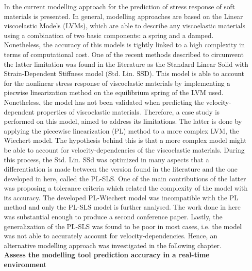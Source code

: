 In  the current modelling approach for the prediction of stress response of soft materials is presented. In general, modelling approaches are based on the Linear viscoelastic Models (LVMs), which are able to describe any viscoelastic materials using a combination of two basic components: a spring and a damped. Nonetheless, the accuracy of this models is tightly linked to a high complexity in terms of computational cost. One of the recent methods described to circumvent the latter limitation was found in the literature as the Standard Linear Solid with Strain-Dependent Stiffness model (Std. Lin. SSD). This model is able to account for the nonlinear stress response of viscoelastic materials by implementing a piecwise linearization method on the equilibrium spring of the LVM used. Nonetheless, the model has not been validated when predicting the velocity-dependent properties of viscoelastic materials. Therefore, a case study is performed on this model, aimed to address its limitations. The latter is done by applying the piecewise linearization (PL) method to a more complex LVM, the Wiechert model. The hypothesis behind this is that a more complex model might be able to account for velocity-dependencies of the viscoelastic materials. During this process, the Std. Lin. SSd was optimized in many aspects that a differentiation is made between the version found in the literature and the one developed in here, called the PL-SLS. One of the main contributions of the latter was proposing a tolerance criteria which related the complexity of the model with its accuracy. The developed PL-Wiechert model was incompatible with the PL method and only the PL-SLS model is further analysed. The work done in here was substantial enough to produce a second conference paper. Lastly, the generalization of the PL-SLS was found to be poor in most cases, i.e. the model was not able to accurately account for velocity-dependencies. Hence, an alternative modelling approach was investigated in the following chapter.
\\[1em]
\noindent \textbf{\large{ Assess the modelling tool prediction accuracy in a real-time environment}}

